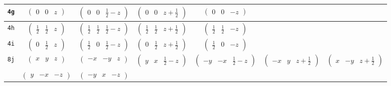 \documentclass[fleqn,9pt,landscape]{jsarticle}
\begin{document}
\begin{center}
\begin{longtable}{ccccccc}
{\tt 4g} & $ \begin{pmatrix} 0 & 0 & z \end{pmatrix} $ & $ \begin{pmatrix} 0 & 0 & \frac{1}{2} - z \end{pmatrix} $ & $ \begin{pmatrix} 0 & 0 & z + \frac{1}{2} \end{pmatrix} $ & $ \begin{pmatrix} 0 & 0 & - z \end{pmatrix} $ & $  $ & $  $ \\ \hline
{\tt 4h} & $ \begin{pmatrix} \frac{1}{2} & \frac{1}{2} & z \end{pmatrix} $ & $ \begin{pmatrix} \frac{1}{2} & \frac{1}{2} & \frac{1}{2} - z \end{pmatrix} $ & $ \begin{pmatrix} \frac{1}{2} & \frac{1}{2} & z + \frac{1}{2} \end{pmatrix} $ & $ \begin{pmatrix} \frac{1}{2} & \frac{1}{2} & - z \end{pmatrix} $ & $  $ & $  $ \\ \hline
{\tt 4i} & $ \begin{pmatrix} 0 & \frac{1}{2} & z \end{pmatrix} $ & $ \begin{pmatrix} \frac{1}{2} & 0 & \frac{1}{2} - z \end{pmatrix} $ & $ \begin{pmatrix} 0 & \frac{1}{2} & z + \frac{1}{2} \end{pmatrix} $ & $ \begin{pmatrix} \frac{1}{2} & 0 & - z \end{pmatrix} $ & $  $ & $  $ \\ \hline
{\tt 8j} & $ \begin{pmatrix} x & y & z \end{pmatrix} $ & $ \begin{pmatrix} - x & - y & z \end{pmatrix} $ & $ \begin{pmatrix} y & x & \frac{1}{2} - z \end{pmatrix} $ & $ \begin{pmatrix} - y & - x & \frac{1}{2} - z \end{pmatrix} $ & $ \begin{pmatrix} - x & y & z + \frac{1}{2} \end{pmatrix} $ & $ \begin{pmatrix} x & - y & z + \frac{1}{2} \end{pmatrix} $ \\
& $ \begin{pmatrix} y & - x & - z \end{pmatrix} $ & $ \begin{pmatrix} - y & x & - z \end{pmatrix} $ & $  $ & $  $ & $  $ & $  $ \\
\end{longtable}
\end{center}
\end{document}
